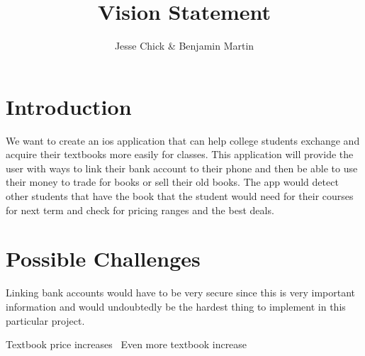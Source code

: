 \documentclass[12pt]{article}
\title{Vision Statement}
\author{Jesse Chick & Benjamin Martin}
\begin{document}
\maketitle
\tableofcontents



\section{Introduction}
We want to create an ios application that can help college students exchange and acquire their textbooks more easily for classes.
This application will provide the user with ways to link their bank account to their phone and then be able to use their money to trade for books or sell their old books.
The app would detect other students that have the book that the student would need for their courses for next term and check for pricing ranges and the best deals.

\section{Possible Challenges}

Linking bank accounts would have to be very secure since this is very important information and would undoubtedly be the hardest thing to implement in this particular project.


Textbook price increases~\cite{bookhuff}
Even more textbook increase~\cite{booknbc}




\end{document}
